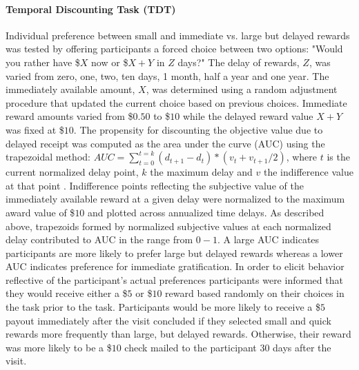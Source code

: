 \documentclass[utf8]{frontiersSCNS} %
\begin{document}
\paragraph{Temporal Discounting Task (TDT)} Individual preference between small and immediate vs. large but delayed rewards was tested by offering participants a forced choice between two options: "Would you rather have \$$X$ now or \$$X+Y$ in $Z$ days?" The delay of rewards, $Z$, was varied from zero, one, two, ten days, 1 month, half a year and one year. The immediately available amount, $X$, was determined using a random adjustment procedure that updated the current choice based on previous choices. Immediate reward amounts varied from \$$0.50$ to \$$10$ while the delayed reward value $X+Y$ was fixed at \$$10$. The propensity for discounting the objective value due to delayed receipt was computed as the area under the curve (AUC) using the trapezoidal method: $AUC = \sum_{t=0}^{t=k} (d_{t+1}-d_t)*(v_t+v_{t+1} /2)$, where $t$ is the current normalized delay point, $k$ the maximum delay and $v$ the indifference value at that point \citep{Borges2016,olson2007adolescents, myerson2001area}. Indifference points reflecting the subjective value of the immediately available reward at a given delay were normalized to the maximum award value of \$$10$ and plotted across annualized time delays. As described above, trapezoids formed by normalized subjective values at each normalized delay contributed to AUC in the range from $0-1$.  A large AUC indicates participants are more likely to prefer large but delayed rewards whereas a lower AUC indicates preference for immediate gratification. In order to elicit behavior reflective of the participant's actual preferences participants were informed that they would receive either a \$$5$ or \$$10$ reward based randomly on their choices in the task prior to the task. Participants would be more likely to receive a \$$5$ payout immediately after the visit concluded if they selected small and quick rewards more frequently than large, but delayed rewards. Otherwise, their reward was more likely to be a \$$10$ check mailed to the participant 30 days after the visit. 
\vspace{2pt}
\end{document}
